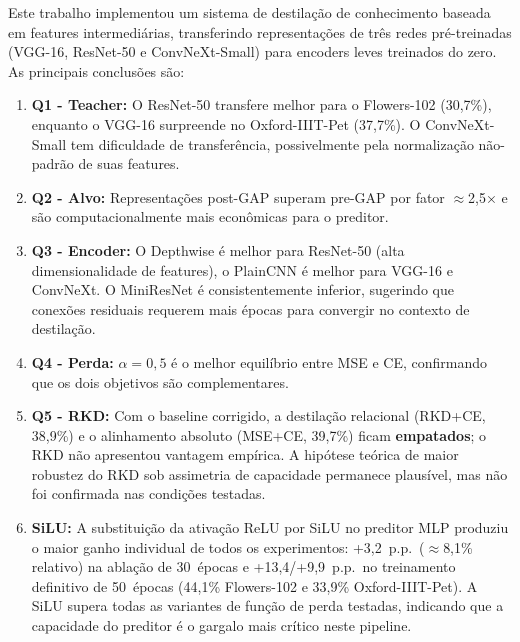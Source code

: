 \documentclass[
  article,            %
  11pt,               %
  letterpaper,        %
  oneside,            %
  sumario = tradicional
]{abntex2}
\begin{document}
Este trabalho implementou um sistema de destilação de conhecimento baseada em
features intermediárias, transferindo representações de três redes pré-treinadas
(VGG-16, ResNet-50 e ConvNeXt-Small) para encoders leves treinados do zero. As principais conclusões são:

\begin{enumerate}
  \item \textbf{Q1 - Teacher:} O ResNet-50 transfere melhor para o Flowers-102
    (30,7\%), enquanto o VGG-16 surpreende no Oxford-IIIT-Pet (37,7\%). O
    ConvNeXt-Small tem dificuldade de transferência, possivelmente pela
    normalização não-padrão de suas features.

  \item \textbf{Q2 - Alvo:} Representações post-GAP superam pre-GAP por fator
    $\approx$2,5× e são computacionalmente mais econômicas para o preditor.

  \item \textbf{Q3 - Encoder:} O Depthwise é melhor para ResNet-50 (alta
    dimensionalidade de features), o PlainCNN é melhor para VGG-16 e ConvNeXt.
    O MiniResNet é consistentemente inferior, sugerindo que conexões residuais
    requerem mais épocas para convergir no contexto de destilação.

  \item \textbf{Q4 - Perda:} $\alpha{=}0{,}5$ é o melhor equilíbrio entre MSE
    e CE, confirmando que os dois objetivos são complementares.

  \item \textbf{Q5 - RKD:} Com o baseline corrigido, a destilação relacional
    (RKD+CE, 38,9\%) e o alinhamento absoluto (MSE+CE, 39,7\%) ficam
    \textbf{empatados}; o RKD não apresentou vantagem empírica. A hipótese
    teórica de maior robustez do RKD sob assimetria de capacidade permanece
    plausível, mas não foi confirmada nas condições testadas.

  \item \textbf{SiLU:} A substituição da ativação ReLU por SiLU no preditor
    MLP produziu o maior ganho individual de todos os experimentos: +3,2~p.p.\ (${\approx}$8,1\% relativo) na
    ablação de 30~épocas e +13,4/+9,9~p.p.\ no treinamento definitivo de
    50~épocas (44,1\% Flowers-102 e 33,9\% Oxford-IIIT-Pet). A SiLU supera
    todas as variantes de função de perda testadas, indicando que a capacidade
    do preditor é o gargalo mais crítico neste pipeline.
\end{enumerate}
\end{document}
